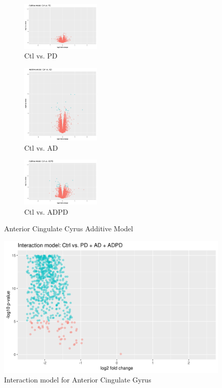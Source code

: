 \begin{figure}
\begin{subfigure}[b]{0.33\linewidth}
\centering
\includegraphics[width=1.5in]{./Figures/volcano/ACG_Volcano_AdditiveModel_CtrlvsPD.png}
\caption{Ctl vs. PD}
\end{subfigure}%
\begin{subfigure}[b]{0.33\linewidth}
\centering
\includegraphics[width=1.5in]{./Figures/volcano/ACG_Volcano_AdditiveModel_CtrlvsAD.png}
\caption{Ctl vs. AD}
\end{subfigure}%
\begin{subfigure}[b]{0.33\linewidth}
\centering
\includegraphics[width=1.5in]{./Figures/volcano/ACG_Volcano_AdditiveModel_CtrlvsADPD.png}
\caption{Ctl vs. ADPD}
\end{subfigure}
\caption{\label{ACGvolcano}Anterior Cingulate Cyrus Additive Model}

\includegraphics[width=\textwidth]{./Figures/volcano/ACG_InteractionModel_CtrlvsSum.png}
\caption{Interaction model for Anterior Cingulate Gyrus}

\end{figure}


